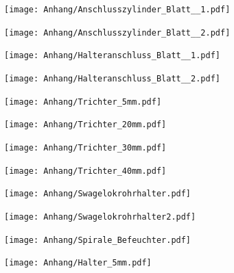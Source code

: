 \begin{figure}  
	\texttt{[image: Anhang/Anschlusszylinder\_Blatt\_\_1.pdf]}
\end{figure}

\begin{figure}  
	\texttt{[image: Anhang/Anschlusszylinder\_Blatt\_\_2.pdf]}
\end{figure}

\begin{figure}  
	\texttt{[image: Anhang/Halteranschluss\_Blatt\_\_1.pdf]}
\end{figure}

\begin{figure}  
	\texttt{[image: Anhang/Halteranschluss\_Blatt\_\_2.pdf]}
\end{figure}

\begin{figure}  
	\texttt{[image: Anhang/Trichter\_5mm.pdf]}
\end{figure}

\begin{figure} 
	\texttt{[image: Anhang/Trichter\_20mm.pdf]}
\end{figure}

\begin{figure}
	\texttt{[image: Anhang/Trichter\_30mm.pdf]}
\end{figure}

\begin{figure}  
	\texttt{[image: Anhang/Trichter\_40mm.pdf]}
\end{figure}

\begin{figure}  
	\texttt{[image: Anhang/Swagelokrohrhalter.pdf]}
\end{figure}

\begin{figure}  
	\texttt{[image: Anhang/Swagelokrohrhalter2.pdf]}
\end{figure}

\begin{figure}  
	\texttt{[image: Anhang/Spirale\_Befeuchter.pdf]}
\end{figure}

\begin{figure}  
	\texttt{[image: Anhang/Halter\_5mm.pdf]}
\end{figure}

